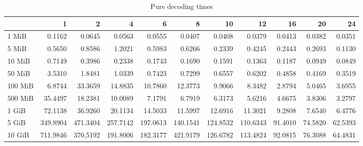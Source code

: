 \begin{table}[!h]
	\caption{Pure decoding times}
	\begin{tabular}{lrrrrrrrrrr}
		\toprule
		\diagbox{File sizes }{Threads} &        1  &        2  &        4  &        6  &        8  &        10 &        12 &       16 &       20 &       24 \\
		\midrule
		1 MiB   &    0.1162 &    0.0645 &    0.0563 &    0.0555 &    0.0407 &    0.0408 &    0.0379 &   0.0413 &   0.0382 &   0.0351 \\
		5 MiB   &    0.5650 &    0.8586 &    1.2021 &    0.5983 &    0.6266 &    0.2339 &    0.4245 &   0.2443 &   0.2693 &   0.1130 \\
		10 MiB  &    0.7149 &    0.3986 &    0.2338 &    0.1743 &    0.1690 &    0.1591 &    0.1363 &   0.1187 &   0.0949 &   0.0849 \\
		50 MiB  &    3.5310 &    1.8481 &    1.0339 &    0.7423 &    0.7299 &    0.6557 &    0.6202 &   0.4858 &   0.4169 &   0.3519 \\
		100 MiB &    6.8744 &   33.3659 &   14.8835 &   10.7860 &   12.3773 &    9.9066 &    8.3482 &   2.8794 &   5.0465 &   3.6955 \\
		500 MiB &   35.4497 &   18.2381 &   10.0089 &    7.1791 &    6.7919 &    6.3173 &    5.6216 &   4.6675 &   3.8306 &   3.2797 \\
		1 GiB   &   72.1138 &   36.9260 &   20.1134 &   14.5033 &   11.5997 &   12.6916 &   11.3021 &   9.2808 &   7.6540 &   6.4776 \\
		5 GiB   &  349.8904 &  471.3404 &  257.7142 &  197.0613 &  140.1541 &  124.8532 &  110.6343 &  91.4010 &  74.5820 &  62.5393 \\
		10 GiB  &  711.9846 &  370,5192&  191.8006 &  182.3177 &  421.9179 &  126.6782 &  113.4824 &  92.0815 &  76.3088 &  64.4831 \\
		\bottomrule
	\end{tabular}
\end{table}

